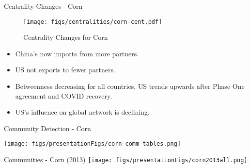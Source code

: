 \documentclass[10pt,xcolor={dvipsnames}]{beamer}
\begin{document}
\begin{frame}{Centrality Changes - Corn}
    \begin{figure}
        \centering
        \caption*{\footnotesize Centrality Changes for Corn}
        \texttt{[image: figs/centralities/corn-cent.pdf]}
    \end{figure}
    \begin{itemize}
        \small
        \item[\ding{213}] China's now imports from more partners. 
        \item[\ding{213}] US not exports to fewer partners. 
        \item[\ding{213}] Betweenness decreasing for all countries, US trends upwards after Phase One agreement and COVID recovery. 
        \item[\ding{213}] US's influence on global network is declining.  
    \end{itemize}
\end{frame}

\begin{frame}[plain]{Community Detection - Corn}


\texttt{[image: figs/presentationFigs/corn-comm-tables.png]}
\end{frame}

\begin{frame}{Communities - Corn (2013) }
\texttt{[image: figs/presentationFigs/corn2013all.png]}\\



\end{frame}
\end{document}
